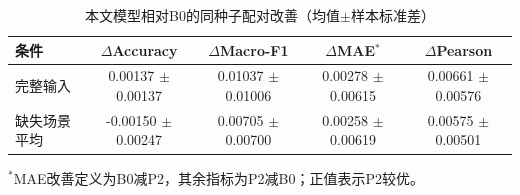 \begin{table}[htbp]
\centering
\caption{本文模型相对B0的同种子配对改善（均值$\pm$样本标准差）}
\label{tab:q2_cleanselect_paired_delta}
\small
\setlength{\tabcolsep}{3pt}
\renewcommand{\arraystretch}{1.2}
\begin{tabular}{lcccc}
\toprule
条件 & $\Delta$Accuracy & $\Delta$Macro-F1 & $\Delta$MAE$^{*}$ & $\Delta$Pearson \\
\midrule
完整输入 & \shortstack[c]{0.00137 \\ $\pm$ 0.00137} & \shortstack[c]{0.01037 \\ $\pm$ 0.01006} & \shortstack[c]{0.00278 \\ $\pm$ 0.00615} & \shortstack[c]{0.00661 \\ $\pm$ 0.00576} \\
\addlinespace[2pt]
缺失场景平均 & \shortstack[c]{-0.00150 \\ $\pm$ 0.00247} & \shortstack[c]{0.00705 \\ $\pm$ 0.00700} & \shortstack[c]{0.00258 \\ $\pm$ 0.00619} & \shortstack[c]{0.00575 \\ $\pm$ 0.00501} \\
\bottomrule
\end{tabular}
\par\smallskip\footnotesize $^{*}$MAE改善定义为B0减P2，其余指标为P2减B0；正值表示P2较优。
\end{table}
